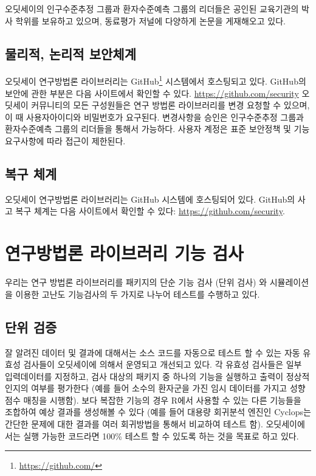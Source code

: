 \documentclass[10.5pt]{book}
\let\rmarkdownfootnote\footnote%
\def\footnote{\protect\rmarkdownfootnote}
\theoremstyle{definition}
\theoremstyle{definition}
\theoremstyle{definition}
\theoremstyle{remark}
\begin{document}
오딧세이의 인구수준추정 그룹과 환자수준예측 그룹의 리더들은 공인된
교육기관의 박사 학위를 보유하고 있으며, 동료평가 저널에 다양하게 논문을
게재해오고 있다.

\subsection{물리적, 논리적 보안체계}\label{--}

오딧세이 연구방법론 라이브러리는 GitHub\footnote{\url{https://github.com/}}
시스템에서 호스팅되고 있다. GitHub의 보안에 관한 부분은 다음 사이트에서
확인할 수 있다. \url{https://github.com/security} 오딧세이 커뮤니티의
모든 구성원들은 연구 방법론 라이브러리를 변경 요청할 수 있으며, 이 때
사용자아이디와 비밀번호가 요구된다. 변경사항을 승인은 인구수준추정
그룹과 환자수준예측 그룹의 리더들을 통해서 가능하다. 사용자 계정은 표준
보안정책 및 기능 요구사항에 따라 접근이 제한된다.

\subsection{복구 체계}\label{-}

오딧세이 연구방법론 라이브러리는 GitHub 시스템에 호스팅되어 있다.
GitHub의 사고 복구 체계는 다음 사이트에서 확인할 수 있다:
\url{https://github.com/security}.

\section{연구방법론 라이브러리 기능 검사}\label{---}

우리는 연구 방법론 라이브러리를 패키지의 단순 기능 검사 (단위 검사) 와
시뮬레이션을 이용한 고난도 기능검사의 두 가지로 나누어 테스트를 수행하고
있다.

\subsection{단위 검증}\label{-}

잘 알려진 데이터 및 결과에 대해서는 소스 코드를 자동으로 테스트 할 수
있는 자동 유효성 검사들이 오딧세이에 의해서 운영되고 개선되고 있다. 각
유효성 검사들은 일부 입력데이터를 지정하고, 검사 대상의 패키지 중 하나의
기능을 실행하고 출력이 정상적인지의 여부를 평가한다 (예를 들어 소수의
환자군을 가진 임시 데이터를 가지고 성향점수 매칭을 시행함). 보다 복잡한
기능의 경우 R에서 사용할 수 있는 다른 기능들을 조합하여 예상 결과를
생성해볼 수 있다 (예를 들어 대용량 회귀분석 엔진인 Cyclops는 간단한
문제에 대한 결과를 여러 회귀방법을 통해서 비교하여 테스트 함).
오딧세이에서는 실행 가능한 코드라면 100\% 테스트 할 수 있도록 하는 것을
목표로 하고 있다.
\end{document}
